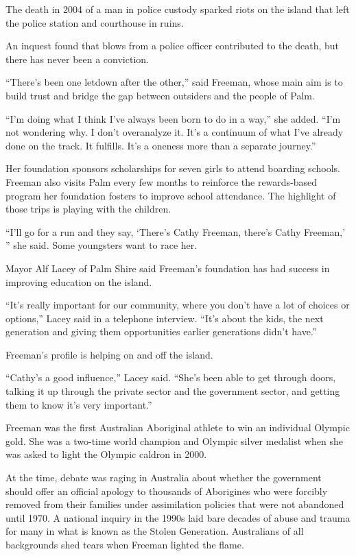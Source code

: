 ﻿\documentclass[12pt]{article}
\begin{document}
The death in 2004 of a man in police custody sparked riots on the island that left the police
station and courthouse in ruins.

An inquest found that blows from a police officer contributed to the death, but there has never been
a conviction.

``There's been one letdown after the other,'' said Freeman, whose main aim is to build trust and
bridge the gap between outsiders and the people of Palm.

``I'm doing what I think I've always been born to do in a way,'' she added. ``I'm not wondering why.
I don't overanalyze it. It's a continuum of what I've already done on the track. It fulfills. It's a
oneness more than a separate journey.''

Her foundation sponsors scholarships for seven girls to attend boarding schools. Freeman also visits
Palm every few months to reinforce the rewards-based program her foundation fosters to improve
school attendance. The highlight of those trips is playing with the children.

``I'll go for a run and they say, `There's Cathy Freeman, there's Cathy Freeman,' '' she said. Some
youngsters want to race her.

Mayor Alf Lacey of Palm Shire said Freeman's foundation has had success in improving education on
the island.

``It's really important for our community, where you don't have a lot of choices or options,'' Lacey
said in a telephone interview. ``It's about the kids, the next generation and giving them
opportunities earlier generations didn't have.''

Freeman's profile is helping on and off the island.

``Cathy's a good influence,'' Lacey said. ``She's been able to get through doors, talking it up
through the private sector and the government sector, and getting them to know it's very
important.''

Freeman was the first Australian Aboriginal athlete to win an individual Olympic gold. She was a
two-time world champion and Olympic silver medalist when she was asked to light the Olympic caldron
in 2000.

At the time, debate was raging in Australia about whether the government should offer an official
apology to thousands of Aborigines who were forcibly removed from their families under assimilation
policies that were not abandoned until 1970. A national inquiry in the 1990s laid bare decades of
abuse and trauma for many in what is known as the Stolen Generation. Australians of all backgrounds
shed tears when Freeman lighted the flame.
\end{document}
